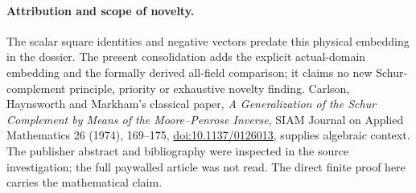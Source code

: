 \paragraph{Attribution and scope of novelty.}
The scalar square identities and negative vectors predate this physical
embedding in the dossier. The present consolidation adds the explicit
actual-domain embedding and the formally derived all-field comparison;
it claims no new Schur-complement principle, priority or exhaustive novelty
finding. Carlson, Haynsworth and Markham's classical paper,
\emph{A Generalization of the Schur Complement by Means of the Moore--Penrose
Inverse}, SIAM Journal on Applied Mathematics 26 (1974), 169--175,
\href{https://doi.org/10.1137/0126013}{doi:10.1137/0126013}, supplies algebraic
context. The publisher abstract and bibliography were inspected in the
source investigation; the full paywalled article was not read. The direct
finite proof here carries the mathematical claim.
